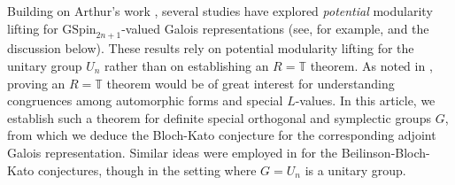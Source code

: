 \documentclass[12pt,oneside,reqno]{amsart}
\theoremstyle{plain}
\begin{document}
	
	
	
	
	
	
	
	
	
	
	
	
	
	
	
	
	
	
	
	
	
	
	
	
	
	Building on Arthur’s work \cite{Arthur2013}, several studies have explored \emph{potential} modularity lifting for $\mathrm{GSpin}_{2n+1}$-valued Galois representations (see, for example, \cite{BoxerCalegariGeePilloni2021,PatrikisTang2022} and the discussion below). These results rely on potential modularity lifting for the unitary group $U_n$ rather than on establishing an $R = \mathbb{T}$ theorem. As noted in \cite{ClozelHarrisTaylor2008}, proving an $R = \mathbb{T}$ theorem would be of great interest for understanding congruences among automorphic forms and special $L$-values.
	In this article, we establish such a theorem for definite special orthogonal and symplectic groups $G$, from which we deduce the Bloch-Kato conjecture for the corresponding adjoint Galois representation. Similar ideas were employed in \cite{LiuTianXiaoZhangZhu2022} for the Beilinson-Bloch-Kato conjectures, though in the setting where $G = U_n$ is a unitary group.
	
	
	
	
	
	
\end{document}
